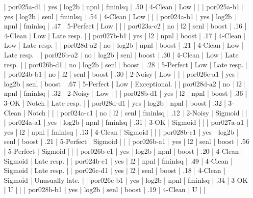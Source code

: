      | por025a-d1   | yes   | log2b | npnl | fminlsq     | .50 | 4-Clean   | Low        |                 |
     | por025a-b1   | yes   | log2b | senl | fminlsq     | .54 | 4-Clean   | Low        |                 |
     | por024a-b1   | yes   | log2b | npnl | fminlsq     | .47 | 5-Perfect | Low        |                 |
     | por023a-c2   | no    | l2    | senl | boost       | .16 | 4-Clean   | Low        | Late resp.      |
     | por027b-b1   | yes   | l2    | npnl | boost       | .17 | 4-Clean   | Low        | Late resp.      |
     | por028d-a2   | no    | log2b | npnl | boost       | .21 | 4-Clean   | Low        | Late resp.      |
     | por026b-a2   | no    | log2b | senl | boost       | .30 | 4-Clean   | Low        | Late resp.      |
     | por026b-d1   | no    | log2b | senl | boost       | .28 | 5-Perfect | Low        | Late resp.      |
     | por024b-b1   | no    | l2    | senl | boost       | .30 | 2-Noisy   | Low        |                 |
     | por026c-a1   | yes   | log2b | senl | boost       | .67 | 5-Perfect | Low        | Exceptional.    |
     | por028d-a2   | no    | l2    | npnl | fminlsq     | .32 | 2-Noisy   | Low        |                 |
     | por028b-d1   | yes   | l2    | npnl | boost       | .36 | 3-OK      | Notch      | Late resp.      |
     | por028d-d1   | yes   | log2b | npnl | boost       | .32 | 3-Clean   | Notch      |                 |
     | por024a-c1   | no    | l2    | senl | fminlsq     | .12 | 2-Noisy   | Sigmoid    |                 |
     | por024a-a1   | yes   | log2b | npnl | fminlsq     | .31 | 3-OK      | Sigmoid    |                 |
     | por027a-a1   | yes   | l2    | npnl | fminlsq     | .13 | 4-Clean   | Sigmoid    |                 |
     | por028b-c1   | yes   | log2b | senl | boost       | .21 | 5-Perfect | Sigmoid    |                 |
     | por026b-a1   | yes   | l2    | senl | boost       | .56 | 5-Perfect | Sigmoid    |                 |
     | por026b-c1   | yes   | log2b | npnl | boost       | .20 | 4-Clean   | Sigmoid    | Late resp.      |
     | por024b-c1   | yes   | l2    | npnl | fminlsq     | .49 | 4-Clean   | Sigmoid    | Late resp.      |
     | por026c-d1   | yes   | l2    | senl | boost       | .18 | 4-Clean   | Sigmoid    | Unusually late. |
     | por026c-b1   | yes   | log2b | npnl | fminlsq     | .34 | 3-OK      | U          |                 |
     | por028b-b1   | yes   | log2b | senl | boost       | .19 | 4-Clean   | U          |                 |
 

